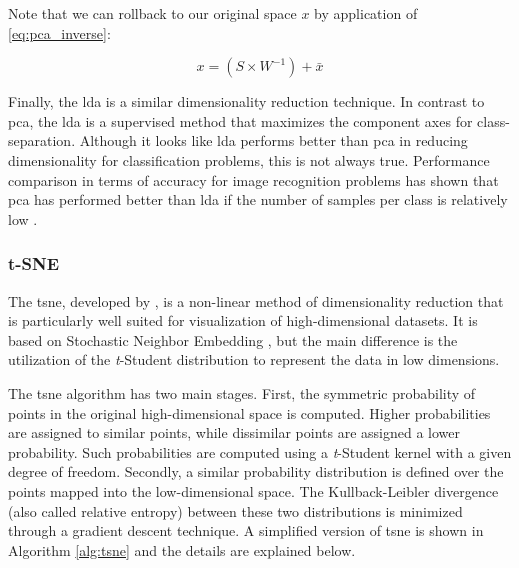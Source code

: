 Note that we can rollback to our original space $x$ by application of \autoref{eq:pca_inverse}:

\begin{equation}
\label{eq:pca_inverse}
x = (S \times W^{-1}) + \bar{x}
\end{equation}

Finally, the \acf{lda} \citep{izenman2013linear} is a similar dimensionality reduction technique. In contrast to \acs{pca}, the \acs{lda} is a supervised method that maximizes the component axes for class-separation. Although it looks like \acs{lda} performs better than \acs{pca} in reducing dimensionality for classification problems, this is not always true. Performance comparison in terms of accuracy for image recognition problems has shown that \acs{pca} has performed better than \acs{lda} if the number of samples per class is relatively low \citep{martinez2001pca}.

\subsubsection{t-SNE}

The \acf{tsne}, developed by \cite{tsne}, is a non-linear method of dimensionality reduction that is particularly well suited for visualization of high-dimensional datasets. It is based on Stochastic Neighbor Embedding \citep{sne}, but the main difference is the utilization of the \textit{t}-Student distribution to represent the data in low dimensions.

The \acs{tsne} algorithm has two main stages. First, the symmetric probability of points in the original high-dimensional space is computed. Higher probabilities are assigned to similar points, while dissimilar points are assigned a lower probability. Such probabilities are computed using a \textit{t}-Student kernel with a given degree of freedom. Secondly, a similar probability distribution is defined over the points mapped into the low-dimensional space. The Kullback-Leibler divergence (also called relative entropy) between these two distributions is minimized through a gradient descent technique. A simplified version of \acs{tsne} is shown in Algorithm \ref{alg:tsne} and the details are explained below.


